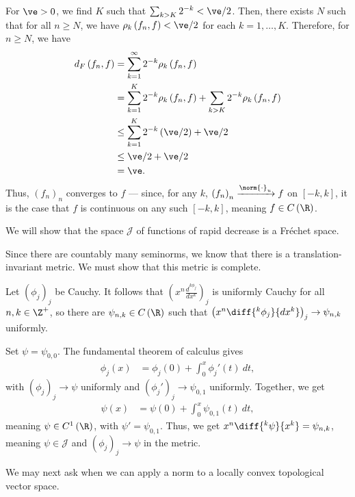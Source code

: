 \documentclass[10pt]{mypackage}
\begin{document}
\begin{example}
  For $\ve > 0$, we find $K$ such that $\sum_{k > K}2^{-k} < \ve/2$. Then, there exists $N$ such that for all $n\geq N$, we have $\rho_{k}\left(f_n,f\right) < \ve/2$ for each $k=1,\dots,K$. Therefore, for $n\geq N$, we have
  \begin{align*}
    d_F\left(f_n,f\right) &= \sum_{k=1}^{\infty}2^{-k}\rho_{k}\left(f_n,f\right)\\
                          &= \sum_{k=1}^{K}2^{-k}\rho_{k}\left(f_n,f\right) + \sum_{k > K}2^{-k}\rho_k\left(f_n,f\right)\\
                          &\leq \sum_{k=1}^{K}2^{-k}\left(\ve/2\right) + \ve/2\\
                          &\leq \ve/2 + \ve/2\\
                          &= \ve.
  \end{align*}
  Thus, $\left(f_n\right)_n$ converges to $f$ --- since, for any $k$, $\left(f_n\right)_n\xrightarrow{\norm{\cdot}_{u}} f$ on $\left[-k,k\right]$, it is the case that $f$ is continuous on any such $\left[-k,k\right]$, meaning $f\in C\left(\R\right)$.
\end{example}
\begin{example}
  We will show that the space $\mathcal{J}$ of functions of rapid decrease is a Fréchet space.\newline

  Since there are countably many seminorms, we know that there is a translation-invariant metric. We must show that this metric is complete.\newline

  Let $\left(\phi_j\right)_j$ be Cauchy. It follows that $\left(x^{n}\frac{d^{k\phi_{j}}}{dx^{k}}\right)_{j}$ is uniformly Cauchy for all $n,k\in \Z^{+}$, so there are $\psi_{n,k}\in C\left(\R\right)$ such that $\left(x^n\diff{^k\phi_j}{dx^k}\right)_j\rightarrow \psi_{n,k}$ uniformly.\newline

  Set $\psi = \psi_{0,0}$. The fundamental theorem of calculus gives
  \begin{align*}
    \phi_j\left(x\right) &= \phi_j\left(0\right) + \int_{0}^{x} \phi_j'(t)\:dt,
  \end{align*}
  with $\left(\phi_j\right)_j\rightarrow \psi$ uniformly and $\left(\phi_j'\right)_j\rightarrow \psi_{0,1}$ uniformly. Together, we get
  \begin{align*}
    \psi\left(x\right) &= \psi\left(0\right) + \int_{0}^{x} \psi_{0,1}(t)\:dt,
  \end{align*}
  meaning $\psi\in C^1\left(\R\right)$, with $\psi' = \psi_{0,1}$. Thus, we get $x^n\diff{^k\psi}{x^k} = \psi_{n,k}$, meaning $\psi\in \mathcal{J}$ and $\left(\phi_j\right)_j\rightarrow \psi$ in the metric.
\end{example}
We may next ask when we can apply a norm to a locally convex topological vector space.\newline
\end{document}
